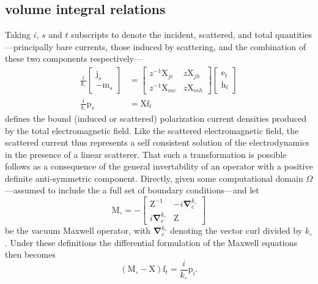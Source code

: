 \documentclass[reprint,aps,prb]{revtex4-2}
\newcommand{\bmm}[1]{\bm{\mathrm{#1}}}
\begin{document}
\subsection{volume integral relations}
\noindent
Taking $i$, $s$ and $t$ subscripts to denote the incident, scattered, and total quantities---principally bare currents, those induced by scattering, and the combination of these two components respectively---
\begin{align}
	\frac{i}{k_{\circ}}
	\begin{bmatrix}
	\bmm{j}_{s} \\
	-\bmm{m}_{s}		
	\end{bmatrix} &=
	\begin{bmatrix}
		z^{-1}\bmm{X}_{je} & z\bmm{X}_{jh}\\
		z^{-1}\bmm{X}_{me} & z\bmm{X}_{mh}
	\end{bmatrix}
	\begin{bmatrix}
	\bmm{e}_{t} \\
	\bmm{h}_{t}		
	\end{bmatrix} \nonumber \\
	\frac{i}{k_{\circ}}\bmm{p}_{s} &= \bmm{X}\bmm{f}_{t} \nonumber 
	\label{indPol}
\end{align} 
defines the bound (induced or scattered) polarization current densities produced by the total electromagnetic field. 
Like the scattered electromagnetic field, the scattered current thus represents a self consistent solution of the electrodynamics in the presence of a linear scatterer. 
That such a transformation is possible follows as a consequence of the general invertability of an operator with a positive definite anti-symmetric component. 
Directly, given some computational domain $\Omega$---assumed to include the a full set of boundary conditions---and let 
\begin{equation}
	\bmm{M}_{\circ} = 
	-\begin{bmatrix}
		\bmm{Z}^{-1} & -i\bm{\nabla}^{k_{\circ}}_{c}\\
		i\bm{\nabla}^{k_{\circ}}_{c} & \bmm{Z}
	\end{bmatrix}	
	\label{maxwellOpt}
\end{equation}
be the vacuum Maxwell operator, with $\bm{\nabla}^{k_{\circ}}_{c}$ denoting the vector curl divided by $k_{\circ}$.
Under these definitions the differential formulation of the Maxwell equations then becomes
\begin{equation}
	\left(\bmm{M}_{\circ} - \bmm{X}\right)\bmm{f}_{t}	
	= \frac{i}{k_{\circ}}\bmm{p}_{i}.
	\label{maxwellEq}
\end{equation}
\end{document}
